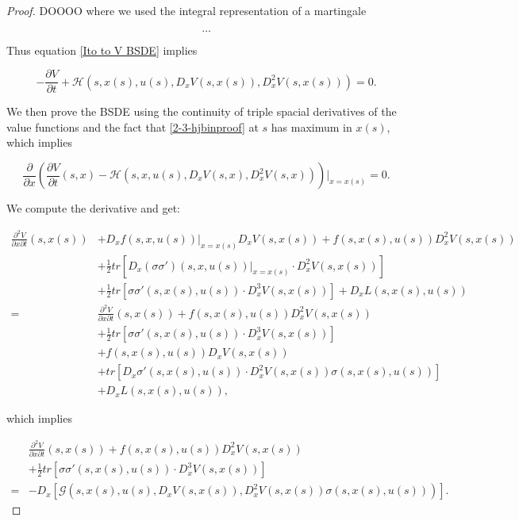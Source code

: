 \begin{theorem}
\begin{proof}
        {\color{red}{} DOOOO where we used the integral representation of a martingale}
        
        \[\dots\]
        
        Thus equation \eqref{Ito to V BSDE} implies

        \begin{equation}\label{2-3-hjbinproof}
            -\frac{\partial V}{\partial t} + \mathcal{H}(s,x(s),u(s),D_xV(s,x(s)),D_x^2V(s,x(s))) = 0.
        \end{equation}

        We then prove the BSDE using the continuity of triple spacial derivatives of the value functions and 
        the fact that \eqref{2-3-hjbinproof} at $s$ has maximum in $x(s)$, which implies

        \[\frac{\partial}{\partial x}\left(\frac{\partial V}{\partial t}(s,x) - \mathcal{H}(s,x,u(s),D_xV(s,x),D_x^2V(s,x))\right)|_{x=x(s)}=0.\]

        We compute the derivative and get:

        \begin{align*}
            \frac{\partial^2V}{\partial x\partial t}(s,x(s)) & + D_xf(s,x,u(s))|_{x=x(s)}D_xV(s,x(s)) + f(s,x(s),u(s))D_x^2V(s,x(s)) \\
            & + \frac{1}{2}tr\left[D_x(\sigma\sigma')(s,x,u(s))|_{x=x(s)}\cdot D_x^2V(s,x(s))\right] \\
            & + \frac{1}{2}tr\left[\sigma\sigma'(s,x(s),u(s))\cdot D_x^3V(s,x(s))\right] + D_xL(s,x(s),u(s)) \\
            = & \frac{\partial^2V}{\partial x\partial t}(s,x(s)) + f(s,x(s),u(s))D_x^2V(s,x(s)) \\
            & + \frac{1}{2}tr\left[\sigma\sigma'(s,x(s),u(s))\cdot D_x^3V(s,x(s))\right] \\
            & + f(s,x(s),u(s))D_xV(s,x(s)) \\
            & + tr\left[D_x\sigma'(s,x(s),u(s))\cdot D_x^2V(s,x(s))\sigma(s,x(s),u(s))\right] \\
            & + D_xL(s,x(s),u(s)),
        \end{align*}

        which implies

        \begin{equation}\label{2-3-relD3G}
            \begin{align*}
                & \frac{\partial^2V}{\partial x\partial t}(s,x(s)) + f(s,x(s),u(s))D_x^2V(s,x(s)) \\
                & + \frac{1}{2}tr\left[\sigma\sigma'(s,x(s),u(s))\cdot D_x^3V(s,x(s))\right] \\
                = & -D_x\left[\mathcal{G}(s,x(s),u(s),D_xV(s,x(s)),D_x^2V(s,x(s))\sigma(s,x(s),u(s)))\right].
            \end{align*}
        \end{equation}


\end{proof}
\end{theorem}

